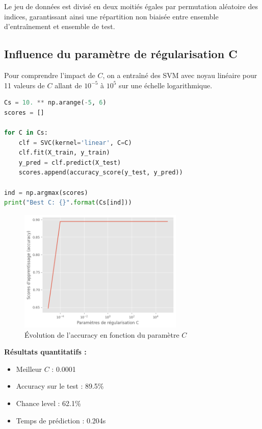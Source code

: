 \documentclass[11pt,a4paper]{article}
\begin{document}
Le jeu de données est divisé en deux moitiés égales par permutation aléatoire des indices, garantissant ainsi une répartition non biaisée entre ensemble d'entraînement et ensemble de test.

\subsection{Influence du paramètre de régularisation C}

Pour comprendre l'impact de $C$, on a entraîné des SVM avec noyau linéaire pour 11 valeurs de $C$ allant de $10^{-5}$ à $10^5$ sur une échelle logarithmique.

\begin{lstlisting}[language=Python, caption=Recherche du meilleur paramètre C]
Cs = 10. ** np.arange(-5, 6)
scores = []

for C in Cs:
    clf = SVC(kernel='linear', C=C)
    clf.fit(X_train, y_train)
    y_pred = clf.predict(X_test)
    scores.append(accuracy_score(y_test, y_pred))

ind = np.argmax(scores)
print("Best C: {}".format(Cs[ind]))
\end{lstlisting}

\begin{figure}[H]
\centering
\includegraphics[width=0.7\textwidth]{images/2.png}
\caption{Évolution de l'accuracy en fonction du paramètre $C$}
\end{figure}

\textbf{Résultats quantitatifs :}
\begin{itemize}
    \item Meilleur $C$ : 0.0001
    \item Accuracy sur le test : 89.5\%
    \item Chance level : 62.1\%
    \item Temps de prédiction : 0.204s
\end{itemize}
\end{document}
